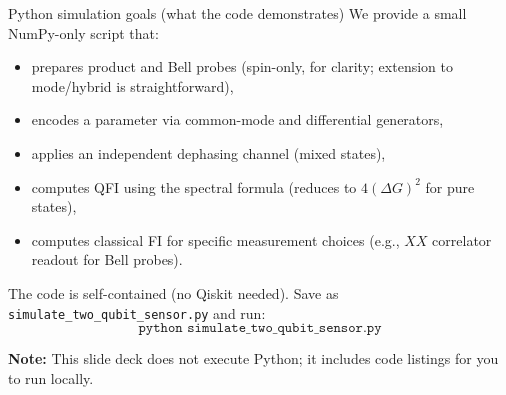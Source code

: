 \documentclass[aspectratio=169]{beamer}
\begin{document}
\begin{frame}[fragile]{Python simulation goals (what the code demonstrates)}
\small
We provide a small NumPy-only script that:
\begin{itemize}
\item prepares product and Bell probes (spin-only, for clarity; extension to mode/hybrid is straightforward),
\item encodes a parameter via common-mode and differential generators,
\item applies an independent dephasing channel (mixed states),
\item computes QFI using the spectral formula (reduces to $4(\Delta G)^2$ for pure states),
\item computes classical FI for specific measurement choices (e.g., $XX$ correlator readout for Bell probes).
\end{itemize}

The code is self-contained (no Qiskit needed). Save as \texttt{simulate\_two\_qubit\_sensor.py} and run:
\[
\texttt{python simulate\_two\_qubit\_sensor.py}
\]

\textbf{Note:} This slide deck does not execute Python; it includes code listings for you to run locally.
\end{frame}
\end{document}
